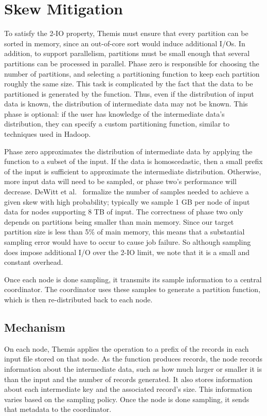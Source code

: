 \section{Skew Mitigation}
\label{sec:phase_zero}

To satisfy the 2-IO property, Themis must ensure that every partition can be
sorted in memory, since an out-of-core sort would induce additional I/Os.  In
addition, to support parallelism, partitions must be small enough that several
partitions can be processed in parallel.  Phase zero is responsible for
choosing the number of partitions, and selecting a partitioning function to
keep each partition roughly the same size.  This task is complicated by the
fact that the data to be partitioned is generated by the \map function.  Thus,
even if the distribution of input data is known, the distribution of
intermediate data may not be known.  This phase is optional: if the user has
knowledge of the intermediate data's distribution, they can specify a custom
partitioning function, similar to techniques used in Hadoop.

Phase zero approximates the distribution of intermediate data by applying the
\map function to a subset of the input.  If the data is homoscedastic, then a
small prefix of the input is sufficient to approximate the intermediate
distribution.  Otherwise, more input data will need to be sampled, or phase
two's performance will decrease.  DeWitt et al.~\cite{ProbabilisticSplitting}
formalize the number of samples needed to achieve a given skew with high
probability; typically we sample 1 GB per node of input data for nodes
supporting 8 TB of input. The correctness of phase two only depends on
partitions being smaller than main memory.  Since our target partition size is
less than 5\% of main memory, this means that a substantial sampling error
would have to occur to cause job failure.  So although sampling does impose
additional I/O over the 2-IO limit, we note that it is a small and constant
overhead.

Once each node is done sampling, it transmits its sample information to a
central coordinator.  The coordinator uses these samples to generate a
partition function, which is then re-distributed back to each node.

\subsection{Mechanism}

On each node, Themis applies the \map operation to a prefix of the records in
each input file stored on that node.  As the \map function produces records,
the node records information about the intermediate data, such as how much
larger or smaller it is than the input and the number of records generated.  It
also stores information about each intermediate key and the associated record's
size.  This information varies based on the sampling policy.  Once the node is
done sampling, it sends that metadata to the coordinator.

